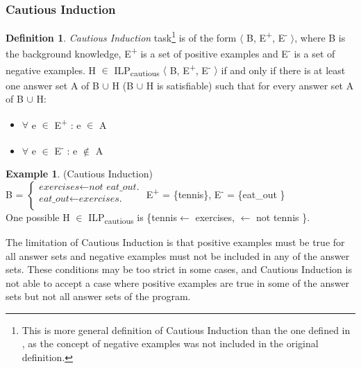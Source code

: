 \documentclass[11pt,twoside]{report}
\theoremstyle{plain}
\theoremstyle{definition}
\newtheorem{defn}[thm]{Definition} %
\newtheorem{examp}{Example}[section]
\begin{document}
\subsubsection{Cautious Induction}

\begin{defn}
\textit{Cautious Induction} task\footnote{This is more general definition of Cautious Induction than the one defined in \cite{Sakama2009}, as the concept of negative examples was not included in the original definition.} is of the form $\langle$ B, E\textsuperscript{+}, E\textsuperscript{-} $\rangle$, where B is the background knowledge, E\textsuperscript{+} is a set of positive examples and E\textsuperscript{-} is a set of negative examples.
H $\in$ ILP\textsubscript{cautious} $\langle$ B, E\textsuperscript{+}, E\textsuperscript{-} $\rangle$ if and only if  there is at least one answer set A of B $\cup$ H (B $\cup$ H is satisfiable) such that for every answer set A of B $\cup$ H: \\
\begin{itemize}
\item $\forall$ e $\in$ E\textsuperscript{+} : e $\in$ A
\item $\forall$ e $\in$ E\textsuperscript{-} : e $\notin$ A
\end{itemize}
\end{defn}

\begin{examp} \normalfont (Cautious Induction) \\

B = $\begin{cases}
	\textit{exercises}  \leftarrow \textit{not \ eat\_out.} \\
	\textit{eat\_out} \leftarrow \textit{exercises.} \\
      \end{cases}$
E\textsuperscript{+} = \{tennis\},      E\textsuperscript{-} = \{eat\_out \} \\

One possible  H $\in$ ILP\textsubscript{cautious} is \{tennis$ \leftarrow$ exercises, $\leftarrow$ not tennis \}.
\end{examp}
\label{cautious_induction_example}

The limitation of Cautious Induction is that positive examples must be true for all answer sets and negative examples must not be included in any of the answer sets. These conditions may be too strict in some cases, and Cautious Induction is not able to accept a case where positive examples are true in some of the answer sets but not all answer sets of the program.
\end{document}
